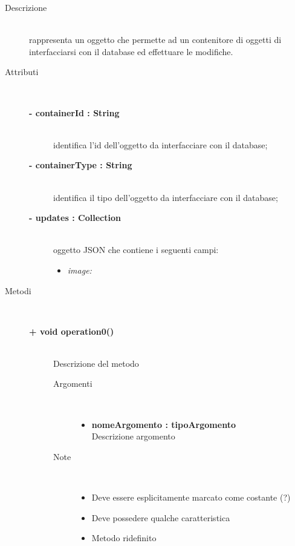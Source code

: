 \begin{description}
\item[Descrizione] \hfill \\
	rappresenta un oggetto che permette ad un contenitore di oggetti di interfacciarsi con il database ed effettuare le modifiche.
	
	
\item[Attributi] \hfill \\
	\begin{description}
		\item[\textbf{- containerId : String			}] \hfill \\
			identifica l'id dell'oggetto da interfacciare con il database;
		\item[\textbf{- containerType : String			}] \hfill \\
			identifica il tipo dell'oggetto da interfacciare con il database;
		\item[\textbf{- updates : Collection			}] \hfill \\
			oggetto JSON che contiene i seguenti campi:
			\begin{itemize}
				\item \textit{image:}  
			\end{itemize}
			
	\end{description}
	
	
\item[Metodi] \hfill \\

	\begin{description}
		\item[\textbf{\color{blue}+ void operation0()			}] \hfill \\
			Descrizione del metodo
			
		\begin{description}
			\item[Argomenti] \hfill \\
				\begin{itemize}
				
					\item \textbf{nomeArgomento : tipoArgomento			} \hfill \\
					Descrizione argomento
					
				\end{itemize}
			\item[Note] \hfill \\
			\begin{itemize}
					\item Deve essere esplicitamente marcato come costante (?)
					\item Deve possedere qualche caratteristica
					\item Metodo ridefinito
				\end{itemize}
		\end{description}
	\end{description}
	

\end{description}
